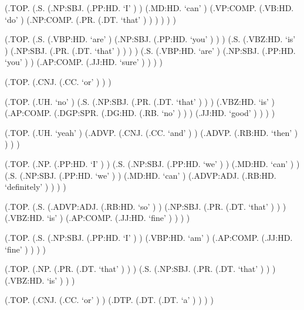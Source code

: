 \documentclass[10pt]{article}
\begin{document}
\begin{parsetree}  (.TOP. (.S. (.NP:SBJ. (.PP:HD. `I' ) ) (.MD:HD. `can' ) (.VP:COMP. (.VB:HD. `do' ) (.NP:COMP. (.PR. (.DT. `that' ) ) ) ) ) ) \end{parsetree}

\begin{parsetree}  (.TOP. (.S. (.VBP:HD. `are' ) (.NP:SBJ. (.PP:HD. `you' ) ) ) (.S. (.VBZ:HD. `is' ) (.NP:SBJ. (.PR. (.DT. `that' ) ) ) ) (.S. (.VBP:HD. `are' ) (.NP:SBJ. (.PP:HD. `you' ) ) (.AP:COMP. (.JJ:HD. `sure' ) ) ) ) \end{parsetree}

\begin{parsetree}  (.TOP. (.CNJ. (.CC. `or' ) ) ) \end{parsetree}

\begin{parsetree}  (.TOP. (.UH. `no' ) (.S. (.NP:SBJ. (.PR. (.DT. `that' ) ) ) (.VBZ:HD. `is' ) (.AP:COMP. (.DGP:SPR. (.DG:HD. (.RB. `no' ) ) ) (.JJ:HD. `good' ) ) ) ) \end{parsetree}

\begin{parsetree}  (.TOP. (.UH. `yeah' ) (.ADVP. (.CNJ. (.CC. `and' ) ) (.ADVP. (.RB:HD. `then' ) ) ) ) \end{parsetree}

\begin{parsetree}  (.TOP. (.NP. (.PP:HD. `I' ) ) (.S. (.NP:SBJ. (.PP:HD. `we' ) ) (.MD:HD. `can' ) ) (.S. (.NP:SBJ. (.PP:HD. `we' ) ) (.MD:HD. `can' ) (.ADVP:ADJ. (.RB:HD. `definitely' ) ) ) ) \end{parsetree}

\begin{parsetree}  (.TOP. (.S. (.ADVP:ADJ. (.RB:HD. `so' ) ) (.NP:SBJ. (.PR. (.DT. `that' ) ) ) (.VBZ:HD. `is' ) (.AP:COMP. (.JJ:HD. `fine' ) ) ) ) \end{parsetree}

\begin{parsetree}  (.TOP. (.S. (.NP:SBJ. (.PP:HD. `I' ) ) (.VBP:HD. `am' ) (.AP:COMP. (.JJ:HD. `fine' ) ) ) ) \end{parsetree}

\begin{parsetree}  (.TOP. (.NP. (.PR. (.DT. `that' ) ) ) (.S. (.NP:SBJ. (.PR. (.DT. `that' ) ) ) (.VBZ:HD. `is' ) ) ) \end{parsetree}

\begin{parsetree}  (.TOP. (.CNJ. (.CC. `or' ) ) (.DTP. (.DT. (.DT. `a' ) ) ) ) \end{parsetree}
\end{document}
